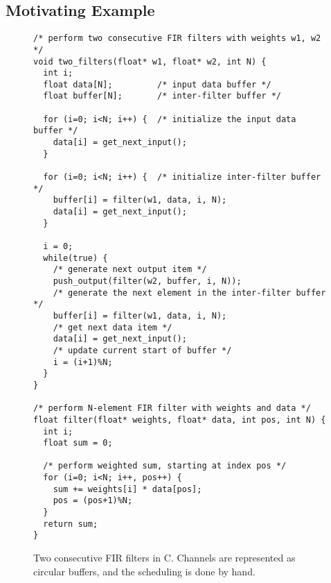 \documentclass{sig-alternate}
\begin{document}
\subsection{Motivating Example}
\begin{figure}[t]
\vspace{-6pt}
\center
\epsfxsize=3.0in
\vspace{-5pt}
\caption{Block diagram of two FIR filters.}
\vspace{-5pt}
\makeline
\vspace{-3pt}
\label{fig:motivating-fig}
\scriptsize
\begin{verbatim}
/* perform two consecutive FIR filters with weights w1, w2 */
void two_filters(float* w1, float* w2, int N) {
  int i;
  float data[N];         /* input data buffer */
  float buffer[N];       /* inter-filter buffer */
  
  for (i=0; i<N; i++) {  /* initialize the input data buffer */
    data[i] = get_next_input();
  }
  
  for (i=0; i<N; i++) {  /* initialize inter-filter buffer */
    buffer[i] = filter(w1, data, i, N);
    data[i] = get_next_input();
  }
  
  i = 0;
  while(true) {
    /* generate next output item */
    push_output(filter(w2, buffer, i, N));
    /* generate the next element in the inter-filter buffer */
    buffer[i] = filter(w1, data, i, N);
    /* get next data item */
    data[i] = get_next_input();
    /* update current start of buffer */
    i = (i+1)%N;
  }
}

/* perform N-element FIR filter with weights and data */
float filter(float* weights, float* data, int pos, int N) {
  int i;
  float sum = 0;

  /* perform weighted sum, starting at index pos */
  for (i=0; i<N; i++, pos++) {
    sum += weights[i] * data[pos];
    pos = (pos+1)%N;
  }
  return sum;
}
\end{verbatim}
\vspace{-18pt}
\caption{Two consecutive FIR filters in C.  Channels are represented
as circular buffers, and the scheduling is done by hand.
\protect\label{fig:motivating-example}}
\makeline
\vspace{-12pt}
\end{figure}
\end{document}
